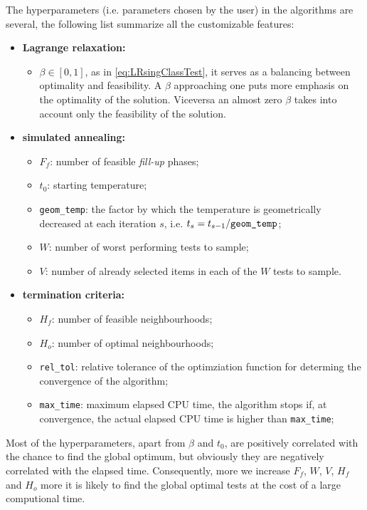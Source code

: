 The hyperparameters (i.e. parameters chosen by the user) in the algorithms are several, the following list summarize all the customizable features:
\begin{itemize}
	\item \textbf{Lagrange relaxation:} 
	\begin{itemize}
		\item $\beta \in  [0,1]$, as in \eqref{eq:LRsingClassTest}, it serves as a balancing between optimality and feasibility. A $\beta$ approaching one puts more emphasis on the optimality of the solution. Viceversa an almost zero $\beta$ takes into account only the feasibility of the solution.
		\end{itemize}
	\item \textbf{simulated annealing:}\begin{itemize}
		\item $F_f$: number of feasible \emph{fill-up} phases;
		\item $t_0$: starting temperature;
		\item \texttt{geom\_temp}: the factor by which the temperature is geometrically decreased at each iteration $s$, i.e. $t_s=t_{s-1}/\text{\texttt{geom\_temp}}$;
		\item $W$: number of worst performing tests to sample;
		\item $V$: number of already selected items in each of the $W$ tests to sample.
	\end{itemize}
	\item \textbf{termination criteria:} \begin{itemize}
		\item $H_f$: number of feasible neighbourhoods;
		\item $H_o$: number of optimal neighbourhoods;
	 	\item \texttt{rel\_tol}: relative tolerance of the optimziation function for determing the convergence of the algorithm;
	\item \texttt{max\_time}: maximum elapsed CPU time, the algorithm stops if, at convergence, the actual elapsed CPU time is higher than \texttt{max\_time};
	\end{itemize}
\end{itemize}

Most of the hyperparameters, apart from $\beta$ and $t_0$, are positively correlated with the chance to find the global optimum, but obviously they are negatively correlated with the elapsed time. Consequently, more we increase  $F_f$, $W$, $V$, $H_f$ and $H_o$ more it is likely to find the global optimal tests at the cost of a large computional time.

